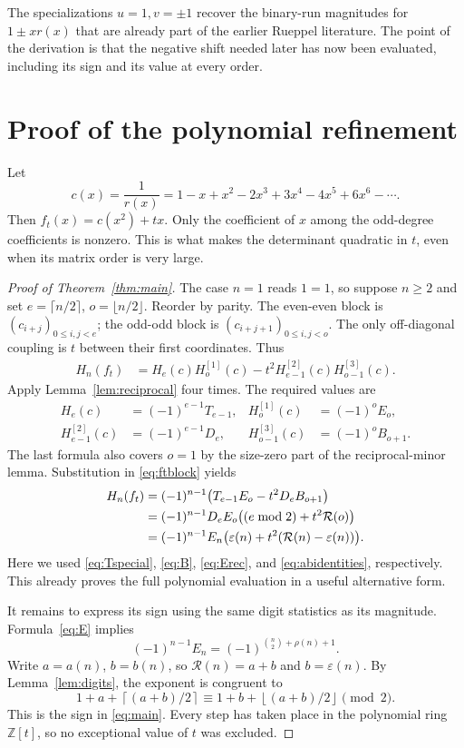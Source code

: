\documentclass[11pt,a4paper]{article}
\numberwithin{equation}{section}
\theoremstyle{definition}
\theoremstyle{remark}
\newcommand{\Z}{\mathbb Z}
\newcommand{\Runs}{\mathcal R}
\newcommand{\Ones}{\rho}
\newcommand{\eps}{\varepsilon}
\newcommand{\ceil}[1]{\left\lceil #1\right\rceil}
\newcommand{\floor}[1]{\left\lfloor #1\right\rfloor}
\begin{document}
The specializations $u=1,v=\pm1$ recover the binary-run magnitudes for
$1\pm xr(x)$ that are already part of the earlier Rueppel literature.
The point of the derivation is that the negative shift needed later has
now been evaluated, including its sign and its value at every order.

\section{Proof of the polynomial refinement}\label{sec:mainproof}

Let
\begin{equation}\label{eq:cdef}
 c(x)=\frac1{r(x)}=1-x+x^2-2x^3+3x^4-4x^5+6x^6-\cdots.
\end{equation}
Then $f_t(x)=c(x^2)+tx$. Only the coefficient of $x$ among the
odd-degree coefficients is nonzero. This is what makes the determinant
quadratic in $t$, even when its matrix order is very large.

\begin{proof}[Proof of Theorem~\ref{thm:main}]
The case $n=1$ reads $1=1$, so suppose $n\ge2$ and set
$e=\lceil n/2\rceil$, $o=\lfloor n/2\rfloor$. Reorder by parity.
The even-even block is $(c_{i+j})_{0\le i,j<e}$; the odd-odd block is
$(c_{i+j+1})_{0\le i,j<o}$. The only off-diagonal coupling is $t$ between
their first coordinates. Thus
\begin{align}
 H_n(f_t)
 &=H_e(c)H_o^{[1]}(c)
   -t^2H_{e-1}^{[2]}(c)H_{o-1}^{[3]}(c).\label{eq:ftblock}
\end{align}
Apply Lemma~\ref{lem:reciprocal} four times. The required values are
\begin{align}
 H_e(c)&=(-1)^{e-1}T_{e-1},&
 H_o^{[1]}(c)&=(-1)^oE_o,\label{eq:four1}\\
 H_{e-1}^{[2]}(c)&=(-1)^{e-1}D_e,&
 H_{o-1}^{[3]}(c)&=(-1)^oB_{o+1}.\label{eq:four2}
\end{align}
The last formula also covers $o=1$ by the size-zero part of the
reciprocal-minor lemma. Substitution in \eqref{eq:ftblock} yields
\begin{align}
 H_n(f_t)
 &=(-1)^{n-1}\bigl(T_{e-1}E_o-t^2D_eB_{o+1}\bigr)\notag\\
 &=(-1)^{n-1}D_eE_o\bigl((e\bmod2)+t^2\Runs(o)\bigr)\notag\\
 &=(-1)^{n-1}E_n\bigl(\eps(n)+t^2(\Runs(n)-\eps(n))\bigr).
 \label{eq:ftE}
\end{align}
Here we used \eqref{eq:Tspecial}, \eqref{eq:B}, \eqref{eq:Erec}, and
\eqref{eq:abidentities}, respectively. This already proves the full
polynomial evaluation in a useful alternative form.

It remains to express its sign using the same digit statistics as its
magnitude. Formula~\eqref{eq:E} implies
\[
 (-1)^{n-1}E_n=(-1)^{\binom n2+\Ones(n)+1}.
\]
Write $a=a(n)$, $b=b(n)$, so $\Runs(n)=a+b$ and $b=\eps(n)$.
By Lemma~\ref{lem:digits}, the exponent is congruent to
\[
 1+a+\ceil{(a+b)/2}
 \equiv 1+b+\floor{(a+b)/2}\pmod2.
\]
This is the sign in \eqref{eq:main}. Every step has taken place in the
polynomial ring $\Z[t]$, so no exceptional value of $t$ was excluded.
\end{proof}
\end{document}
